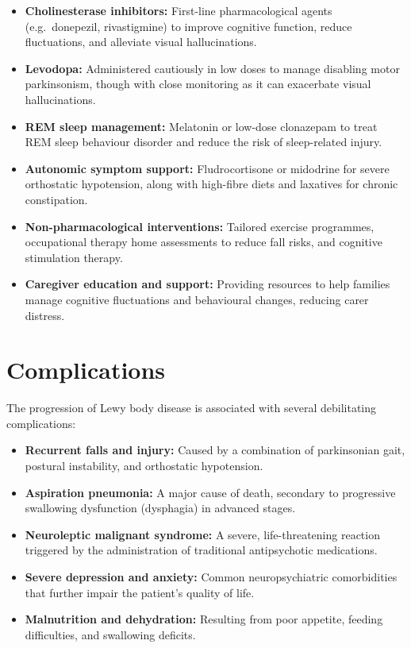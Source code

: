 \begin{itemize}
    \item \textbf{Cholinesterase inhibitors:} First-line pharmacological agents (e.g.\ donepezil, rivastigmine) to improve cognitive function, reduce fluctuations, and alleviate visual hallucinations.
    \item \textbf{Levodopa:} Administered cautiously in low doses to manage disabling motor parkinsonism, though with close monitoring as it can exacerbate visual hallucinations.
    \item \textbf{REM sleep management:} Melatonin or low-dose clonazepam to treat REM sleep behaviour disorder and reduce the risk of sleep-related injury.
    \item \textbf{Autonomic symptom support:} Fludrocortisone or midodrine for severe orthostatic hypotension, along with high-fibre diets and laxatives for chronic constipation.
    \item \textbf{Non-pharmacological interventions:} Tailored exercise programmes, occupational therapy home assessments to reduce fall risks, and cognitive stimulation therapy.
    \item \textbf{Caregiver education and support:} Providing resources to help families manage cognitive fluctuations and behavioural changes, reducing carer distress.
\end{itemize}

\section*{Complications}
The progression of Lewy body disease is associated with several debilitating complications:

\begin{itemize}
    \item \textbf{Recurrent falls and injury:} Caused by a combination of parkinsonian gait, postural instability, and orthostatic hypotension.
    \item \textbf{Aspiration pneumonia:} A major cause of death, secondary to progressive swallowing dysfunction (dysphagia) in advanced stages.
    \item \textbf{Neuroleptic malignant syndrome:} A severe, life-threatening reaction triggered by the administration of traditional antipsychotic medications.
    \item \textbf{Severe depression and anxiety:} Common neuropsychiatric comorbidities that further impair the patient's quality of life.
    \item \textbf{Malnutrition and dehydration:} Resulting from poor appetite, feeding difficulties, and swallowing deficits.
\end{itemize}

